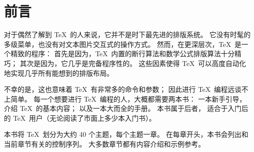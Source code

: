 \documentclass[letterpaper]{book}
\begin{document}
\chapter*{前言}

对于偶然了解到 \TeX\ 的人来说，它并不是时下最先进的排版系统。
它没有时髦的多级菜单，也没有对文本图片交互式的操作方式。
然而，在更深层次，\TeX\ 是一个精致的程序：
首先是因为，\TeX\ 内置的断行算法和数学公式排版算法十分精巧；
其次是因为，它几乎是完备程序性的。
这些因素使得 \TeX\ 可以高度自动化地实现几乎所有能想到的排版布局。

不幸的是，这也意味着 \TeX\ 有非常多的命令和参数；
因此进行 \TeX\ 编程远谈不上简单。
每一个想要进行 \TeX\ 编程的人，大概都需要两本书：
一本新手引导，介绍 \TeX\ 的基本内容；
以及一本大而全的手册。
本书属于后者，
适合于入门后的 \TeX\ 用户（无论阅读了市面上多少本入门书）。

本书将 \TeX\ 划分为大约 40 个主题，每个主题一章。
在每章开头，本书会列出和当前章节有关的控制序列。
大多数章节都有内容介绍和示例参考。
\end{document}
